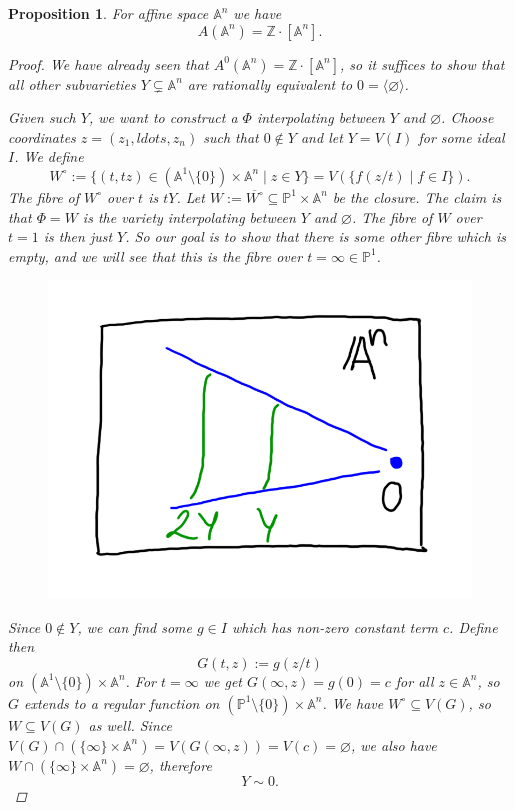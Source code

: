 \documentclass[12pt,a4paper]{amsart}
\theoremstyle{plain}
\newtheorem{prop}[thm]{Proposition}
\theoremstyle{definition}
\theoremstyle{remark}
\begin{document}
\begin{prop}
    For affine space $\mathbb{A}^{n}$ we have
    \[ A(\mathbb{A}^{n})=\mathbb{Z}\cdot [\mathbb{A}^{n}]. \]
    \begin{proof}
	We have already seen that $A^{0}(\mathbb{A}^{n})=\mathbb{Z}\cdot [\mathbb{A}^{n}]$, so it suffices to show that all other subvarieties $Y\subsetneq \mathbb{A}^{n}$ are rationally equivalent to $0=\langle \varnothing\rangle$.

	Given such $Y$, we want to construct a $\Phi$ interpolating between $Y$ and $\varnothing$.
	Choose coordinates $z=(z_{1},ldots,z_{n})$ such that $0\not\in Y$ and let $Y=V(I)$ for some ideal $I$.
	We define
	\[ W^{\circ}:=\{(t,tz)\in (\mathbb{A}^{1}\setminus \{0\})\times \mathbb{A}^{n}\mid z\in Y\}=V(\{f(z/t)\mid f\in I\}). \]
	The fibre of $W^{\circ}$ over $t$ is $tY$.
	Let $W:=\overline{W^{\circ}}\subseteq \mathbb{P}^{1}\times \mathbb{A}^{n}$ be the closure.
	The claim is that $\Phi=W$ is the variety interpolating between $Y$ and $\varnothing$.
	The fibre of $W$ over $t=1$ is then just $Y$.
	So our goal is to show that there is some other fibre which is empty, and we will see that this is the fibre over $t=\infty\in \mathbb{P}^{1}$.
	\begin{figure}[H]
	    \centering
	    \includegraphics[scale=.9]{pictures/scaling}
	\end{figure}

	Since $0\not\in Y$, we can find some $g\in I$ which has non-zero constant term $c$.
	Define then
	\[ G(t,z):=g(z/t) \]
	on $(\mathbb{A}^{1}\setminus \{0\})\times \mathbb{A}^{n}$.
	For $t=\infty$ we get $G(\infty,z)=g(0)=c$ for all $z\in \mathbb{A}^{n}$, so $G$ extends to a regular function on $(\mathbb{P}^{1}\setminus \{0\})\times \mathbb{A}^{n}$.
	We have $W^{\circ}\subseteq V(G)$, so $W\subseteq V(G)$ as well.
	Since $V(G)\cap (\{\infty\}\times \mathbb{A}^{n})=V(G(\infty,z))=V(c)=\varnothing$, we also have $W\cap (\{\infty\}\times \mathbb{A}^{n})=\varnothing$, therefore
	\[ Y\sim 0. \]
    \end{proof}
\end{prop}
\end{document}
